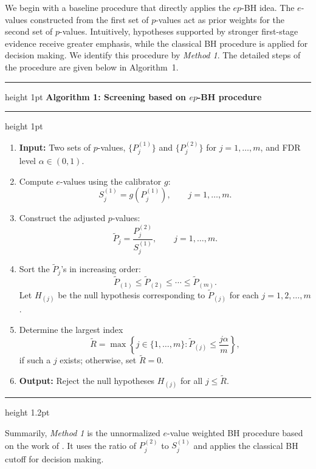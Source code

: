 \documentclass[11pt]{article}
\numberwithin{equation}{section}
\theoremstyle{plain}
\theoremstyle{remark}
\begin{document}
We begin with a baseline procedure that directly applies the $ep$-BH idea. The $e$-values constructed from the first set of $p$-values act as prior weights for the second set of $p$-values. Intuitively, hypotheses supported by stronger first-stage evidence receive greater emphasis, while the classical BH procedure is applied for decision making. We identify this procedure by \textit{Method 1}. The detailed steps of the procedure are given below in Algorithm~1.

\vspace{0.4em}
\hrule height 1pt
\vspace{0.25em}
\noindent\textbf{Algorithm 1: Screening based on $ep$-BH procedure}
\vspace{0.35em}
\hrule height 1pt
\vspace{0.3em}
\begin{enumerate}
\item \textbf{Input:} Two sets of $p$-values, $\{P_j^{(1)}\}$ and $\{P_j^{(2)}\}$ for $j = 1, \dots, m$, and FDR level $\alpha \in (0, 1)$.

\item Compute $e$-values using the calibrator $g$:
\[
S_j^{(1)} = g\!\left(P_j^{(1)}\right), \qquad j = 1, \dots, m.
\]

\item Construct the adjusted $p$-values:
\[
\tilde{P}_j = \frac{P_j^{(2)}}{S_j^{(1)}}, \qquad j = 1, \dots, m.
\]

\item Sort the $\tilde{P}_j$'s in increasing order:
\[
\tilde{P}_{(1)} \leq \tilde{P}_{(2)} \leq \cdots \leq \tilde{P}_{(m)}.
\]
Let $H_{(j)}$ be the null hypothesis corresponding to $\tilde{P}_{(j)}$ for each $j = 1,2,\dots,m$.

\item Determine the largest index
\[
\tilde{R}
= \max \left\{ j \in \{1, \dots, m\} : \tilde{P}_{(j)} \leq \frac{j\alpha}{m} \right\},
\]
if such a $j$ exists; otherwise, set $\tilde{R} = 0$.

\item \textbf{Output:} Reject the null hypotheses $H_{(j)}$ for all $j \leq \tilde{R}$.
\end{enumerate}
\vspace{0.4em}
\hrule height 1.2pt
\vspace{0.5em}

Summarily, \textit{Method 1} is the unnormalized $e$-value weighted BH procedure based on the work of \citet{ignatiadis2024evalues}. It uses the ratio of $P_j^{(2)}$ to $S_j^{(1)}$ and applies the classical BH cutoff for decision making. 
\end{document}
